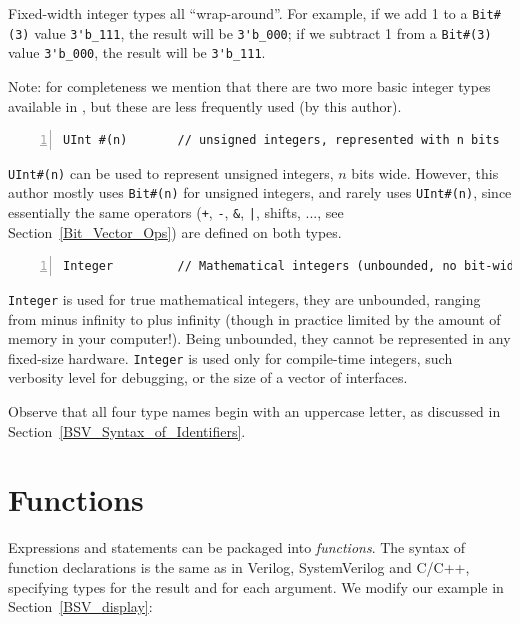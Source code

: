 
Fixed-width integer types all ``wrap-around''.  For example, if we add
1 to a \verb|Bit#(3)| value \verb|3'b_111|, the result will be
\verb|3'b_000|; if we subtract 1 from a \verb|Bit#(3)| value
\verb|3'b_000|, the result will be \verb|3'b_111|.

Note: for completeness we mention that there are two more basic
integer types available in {\BSV}, but these are less frequently used
(by this author).

{\footnotesize
\begin{Verbatim}[frame=single, numbers=left]
   UInt #(n)       // unsigned integers, represented with n bits
\end{Verbatim}
}

\verb|UInt#(n)| can be used to represent unsigned integers, $n$ bits
wide.  However, this author mostly uses \verb|Bit#(n)| for unsigned
integers, and rarely uses \verb|UInt#(n)|, since essentially the same
operators (\verb|+|, \verb|-|, \verb|&|, \verb'|', shifts, ..., see
Section~\ref{Bit_Vector_Ops}) are defined on both types.

{\footnotesize
\begin{Verbatim}[frame=single, numbers=left]
   Integer         // Mathematical integers (unbounded, no bit-width limit)
\end{Verbatim}
}

\verb|Integer| is used for true mathematical integers, {\ie} they are
unbounded, ranging from minus infinity to plus infinity (though in
practice limited by the amount of memory in your computer!).  Being
unbounded, they cannot be represented in any fixed-size hardware.
\verb|Integer| is used only for compile-time integers, such verbosity
level for debugging, or the size of a vector of interfaces.

Observe that all four type names begin with an uppercase letter, as
discussed in Section~\ref{BSV_Syntax_of_Identifiers}.


\section{Functions}

\label{BSV_functions}


Expressions and statements can be packaged into \emph{functions}.  The
syntax of {\BSV} function declarations is the same as in Verilog,
SystemVerilog and C/C++, specifying types for the result and for each
argument.  We modify our example in Section~\ref{BSV_display}:

